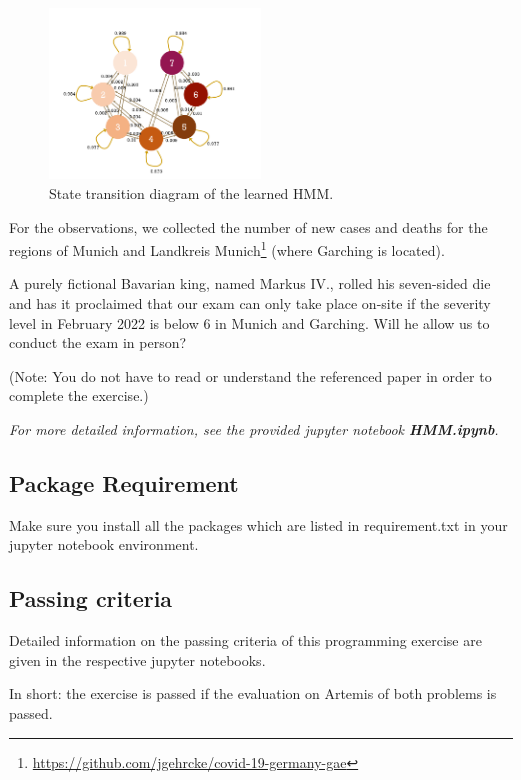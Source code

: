 \documentclass[a4paper,10pt]{article}
\begin{document}
   \begin{figure}[!h]\label{fig1}
       \centering
       \includegraphics[width=0.5\textwidth]{figures/transitions.png}
       \caption{State transition diagram of the learned HMM.}
   \end{figure}	
   
   For the observations, we collected the number of new cases and deaths for the regions of Munich and Landkreis Munich\footnote{\url{https://github.com/jgehrcke/covid-19-germany-gae}} (where Garching
   is located).
   
   A purely fictional Bavarian king, named Markus IV.,
   rolled his seven-sided die and has it proclaimed that our exam can only take place on-site if the severity
   level in February 2022 is below 6 in Munich and Garching. Will he allow us to conduct the exam in person?
   
   (Note: You do not have to read or understand the referenced paper in order to complete the exercise.)
    
    \textit{For more detailed information, see the provided jupyter notebook \textbf{HMM.ipynb}.}
    
    \subsection*{Package Requirement}
    Make sure you install all the packages which are listed in requirement.txt in your jupyter notebook environment.
    
    
    \subsection*{Passing criteria}
    Detailed information on the passing criteria of this programming exercise are given in the respective jupyter notebooks. 
    
    In short: the exercise is passed if the evaluation on Artemis of both problems is passed.
    
\end{document}
